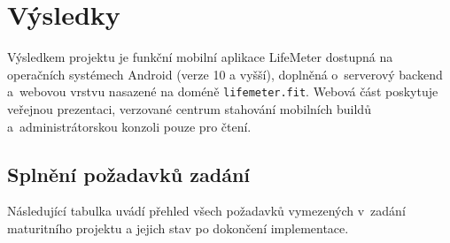 \newcommand{\Screenshot}[1]{%
  \fbox{%
    \begin{minipage}[c][9cm][c]{0.42\textwidth}%
      \centering\small\color{gray!60}[snímek obrazovky: #1]%
    \end{minipage}%
  }%
}

\chapter*{Výsledky}

Výsledkem projektu je funkční mobilní aplikace LifeMeter
dostupná na operačních systémech Android (verze 10 a vyšší),
doplněná o~serverový backend a~webovou vrstvu nasazené na doméně
\texttt{lifemeter.fit}. Webová část poskytuje veřejnou prezentaci,
verzované centrum stahování mobilních buildů a~administrátorskou
konzoli pouze pro čtení.

\section{Splnění požadavků zadání}

Následující tabulka uvádí přehled všech požadavků vymezených v~zadání
maturitního projektu a jejich stav po dokončení implementace.

